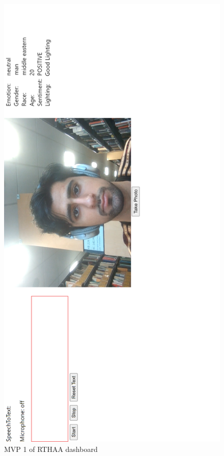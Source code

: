 \documentclass[12pt, a4paper]{article}
\begin{document}
\begin{appendices}
\begin{figure}[H]
    \centering
    \includegraphics[scale=0.53]{images/webapp1.png}
    \caption{MVP 1 of RTHAA dashboard}
    \label{fig:wa1}
\end{figure}


\end{appendices}
\end{document}
